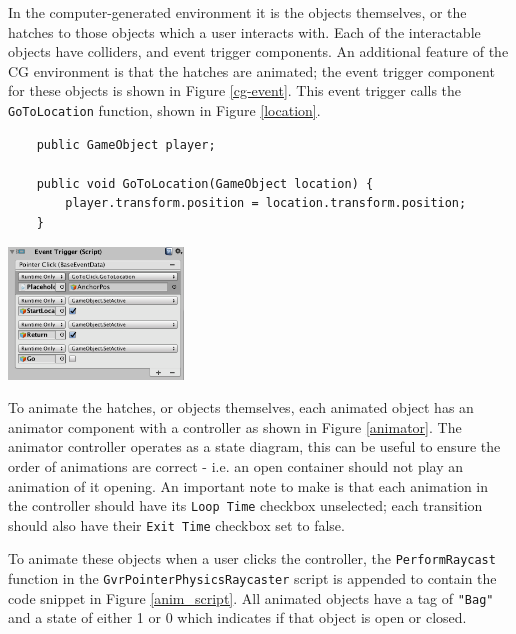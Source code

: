 \documentclass[ %
                    author={Elis Jones},
                supervisor={Dr. Kirsten Cater},
                    degree={BSc},
                     title={The Effect of Presentation Medium on Spatial Cognition},
                  subtitle={in the Virtual Environment},
                      year={2018} ]{dissertation}
\begin{document}
In the computer-generated environment it is the objects themselves, or the hatches to those objects which a user interacts with. Each of the interactable objects have colliders, and event trigger components. An additional feature of the CG environment is that the hatches are animated; the event trigger component for these objects is shown in Figure \ref{cg-event}. This event trigger calls the \lstinline{GoToLocation} function, shown in Figure \ref{location}. 

\begin{minipage}{\textwidth}
\centering
\begin{lstlisting}
	public GameObject player;

	public void GoToLocation(GameObject location) {
		player.transform.position = location.transform.position;
	}
\end{lstlisting}
\label{location}
\end{minipage}

\begin{minipage}{\textwidth}
    \centering
    \includegraphics[width=0.35\textwidth]{images/CG-event-component.png}
    \label{cg-event}
\end{minipage}


To animate the hatches, or objects themselves, each animated object has an animator component with a controller as shown in Figure \ref{animator}. The animator controller operates as a state diagram, this can be useful to ensure the order of animations are correct - i.e. an open container should not play an animation of it opening. An important note to make is that each animation in the controller should have its \lstinline{Loop Time} checkbox unselected; each transition should also have their \lstinline{Exit Time} checkbox set to false. 

To animate these objects when a user clicks the controller, the \lstinline{PerformRaycast} function in the \lstinline{GvrPointerPhysicsRaycaster} script is appended to contain the code snippet in Figure \ref{anim_script}. All animated objects have a tag of \lstinline{"Bag"} and a state of either 1 or 0 which indicates if that object is open or closed. 
\end{document}
